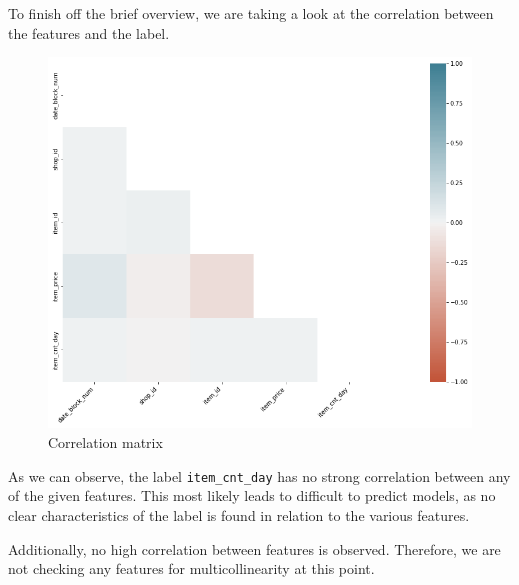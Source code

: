 To finish off the brief overview, we are taking a look at the correlation between the features and the label.

\begin{figure}
\centering
  \includegraphics[width=0.85\linewidth]{external_content/graphs/corr_matrix.png}
\captionsetup{justification=centering}
\caption{Correlation matrix}
\label{corr_matrix}
\end{figure}

\noindent As we can observe, the label \texttt{item\_cnt\_day} has no strong correlation between any of the given features. 
This most likely leads to difficult to predict models, as no clear characteristics of the label is found in relation to the various features.

Additionally, no high correlation between features is observed. Therefore, we are not checking any features for multicollinearity at this point. \cite{MultivariateStatistics}

\clearpage